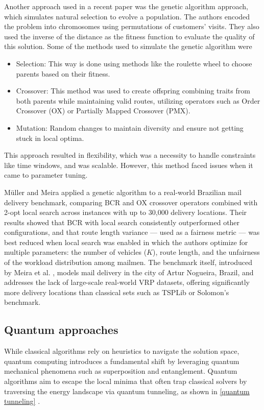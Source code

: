 \documentclass[a4paper]{report}
\begin{document}
{\begin{itemize}
Another approach used in a recent paper was the genetic algorithm approach, which simulates natural selection to evolve a population. The authors encoded the problem into chromosomes using permutations of customers' visits. They also used the inverse of the distance as the fitness function to evaluate the quality of this solution. Some of the methods used to simulate the genetic algorithm were
\begin{itemize}
    \item Selection: This way is done using methods like the roulette wheel to choose parents based on their fitness.
\end{itemize}
\begin{itemize}
    \item Crossover: This method was used to create offspring combining traits from both parents while maintaining valid routes, utilizing operators such as Order Crossover (OX) or Partially Mapped Crossover (PMX). 
\end{itemize}
\begin{itemize}
    \item Mutation: Random changes to maintain diversity and ensure not getting stuck in local optima. 
\end{itemize}

This approach resulted in flexibility, which was a necessity to handle constraints like time windows, and was scalable. However, this method faced issues when it came to parameter tuning.\cite{genvrp}

Müller and Meira \cite{muller2018genetic} applied a genetic algorithm to a real-world Brazilian mail delivery benchmark, comparing BCR and OX crossover operators combined with 2-opt local search across instances with up to 30,000 delivery locations. Their results showed that BCR with local search consistently outperformed other configurations, and that route length variance — used as a fairness metric — was best reduced when local search was enabled in which the authors optimize for multiple parameters: the number 
of vehicles ($K$), route length, and the unfairness of the workload 
distribution among mailmen. The benchmark itself, introduced by Meira et al. \cite{meira2018postvrp}, models mail delivery in the city of Artur Nogueira, Brazil, and addresses the lack of large-scale real-world VRP datasets, offering significantly more delivery locations than classical sets such as TSPLib or Solomon's benchmark.

\subsection{Quantum approaches}
While classical algorithms rely on heuristics to navigate the solution space, quantum computing introduces a fundamental shift by leveraging quantum mechanical phenomena such as superposition and entanglement. Quantum algorithms aim to escape the local minima that often trap classical solvers by traversing the energy landscape via quantum tunneling, as shown in \ref{quantum tunneling} \cite{kadowaki1998quantum}.
\begin{figure}[ht]
\centering


\end{figure}
\end{itemize}}
\end{document}
